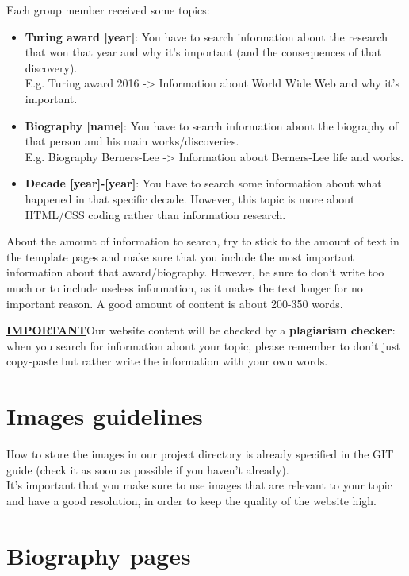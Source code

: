 \documentclass[a4paper,12pt]{article}
\newcommand{\<}{\textless}
\renewcommand{\>}{\textgreater}
\begin{document}
Each group member received some topics:
\begin{itemize}
 \item \textbf{Turing award [year]}: You have to search information about the research that won that year and why it's important (and the consequences of that discovery).\\[.4em]
 E.g. Turing award 2016 -\> Information about World Wide Web and why it's important.

 \item \textbf{Biography [name]}: You have to search information about the biography of that person and his main works/discoveries.\\[.4em]
 E.g. Biography Berners-Lee -\> Information about Berners-Lee life and works.
 
 \item \textbf{Decade [year]-[year]}: You have to search some information about what happened in that specific decade. However, this topic is more about HTML/CSS coding rather than information research.
 
\end{itemize}

About the amount of information to search, try to stick to the amount of text in the template pages and make sure that you include the most important information about that award/biography. However, be sure to don't write too much or to include useless information, as it makes the text longer for no important reason. A good amount of content is about 200-350 words.

\textbf{\underline{IMPORTANT}}\quad Our website content will be checked by a \textbf{plagiarism checker}: when you search for information about your topic, please remember to don't just copy-paste but rather write the information with your own words.

\section{Images guidelines}
How to store the images in our project directory is already specified in the GIT guide (check it as soon as possible if you haven't already).\\
It's important that you make sure to use images that are relevant to your topic and have a good resolution, in order to keep the quality of the website high.

\section{Biography pages}
\end{document}
